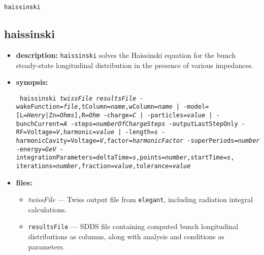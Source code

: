 \documentclass[11pt]{article}
\begin{document}
\begin{latexonly}
\newpage
\begin{center}{\Large\verb|haissinski|}\end{center}
\end{latexonly}
\subsection{haissinski}

\begin{itemize}
\item {\bf description:}  {\tt haissinski} solves the Haissinski equation for the bunch
 steady-state longitudinal distribution in the presence of various impedances.

\item {\bf synopsis:}
\begin{flushleft}{\tt
haissinski {\em twissFile} {\em resultsFile}
 {-wakeFunction={\em file},tColumn={\em name},wColumn={\em name} |
  -model=[L={\em Henry}|Zn={\em Ohms}],R={\em Ohm}} 
 {-charge={\em C} | -particles={\em value} | -bunchCurrent={\em A}}
 {-steps={\em numberOfChargeSteps}}
 {-outputLastStepOnly}
 {-RF=Voltage={\em V},harmonic={\em value} | -length={\em s}}
 {-harmonicCavity=Voltage={\em V},factor={\em harmonicFactor}}
 {-superPeriods={\em number}}
 {-energy={\em GeV}} 
 -integrationParameters=deltaTime={\em s},points={\em number},startTime={\em s},
iterations={\em number},fraction={\em value},tolerance={\em value} 
}\end{flushleft}

\item {\bf files:}
\begin{itemize}
\item {\em twissFile} --- Twiss output file from {\tt elegant}, including radiation
 integral calculations.
\item {\tt resultsFile} --- SDDS file containing computed bunch longitudinal distributions
 as columns, along with analysis and conditions as parameters.
\end{itemize}


\end{itemize}
\end{document}
